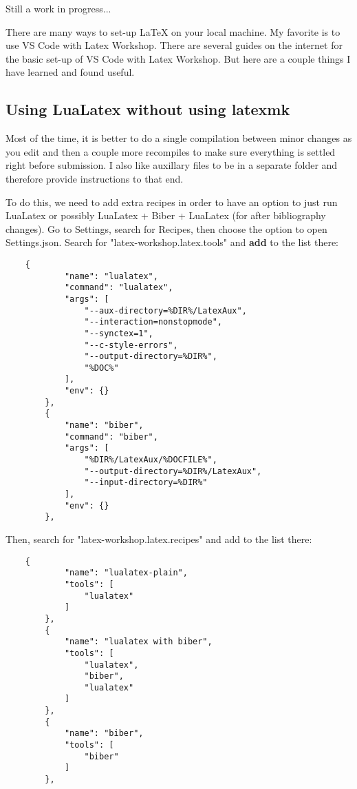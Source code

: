 \documentclass{article}
\begin{document}
Still a work in progress...

There are many ways to set-up LaTeX on your local machine.
My favorite is to use VS Code with Latex Workshop.
There are several guides on the internet for the basic set-up of VS Code with Latex Workshop.
But here are a couple things I have learned and found useful.

\subsection{Using LuaLatex without using latexmk}
Most of the time, it is better to do a single compilation between minor changes as you edit and then a couple more recompiles to make sure everything is settled right before submission.
I also like auxillary files to be in a separate folder and therefore provide instructions to that end.

To do this, we need to add extra recipes in order to have an option to just run LuaLatex or possibly LuaLatex + Biber + LuaLatex (for after bibliography changes).
Go to Settings, search for Recipes, then choose the option to open Settings.json.
Search for "latex-workshop.latex.tools" and \textbf{add} to the list there:
\begin{verbatim}
    {
            "name": "lualatex",
            "command": "lualatex",
            "args": [
                "--aux-directory=%DIR%/LatexAux",
                "--interaction=nonstopmode",
                "--synctex=1",
                "--c-style-errors",
                "--output-directory=%DIR%",
                "%DOC%"
            ],
            "env": {}
        },
        {
            "name": "biber",
            "command": "biber",
            "args": [
                "%DIR%/LatexAux/%DOCFILE%",
                "--output-directory=%DIR%/LatexAux",
                "--input-directory=%DIR%"
            ],
            "env": {}
        },
\end{verbatim}

Then, search for "latex-workshop.latex.recipes" and add to the list there:
\begin{samepage}
    \begin{verbatim}
    {
            "name": "lualatex-plain",
            "tools": [
                "lualatex"
            ]
        },
        {
            "name": "lualatex with biber",
            "tools": [
                "lualatex",
                "biber",
                "lualatex"
            ]
        },
        {
            "name": "biber",
            "tools": [
                "biber"
            ]
        },
\end{verbatim}
\end{samepage}
\end{document}
